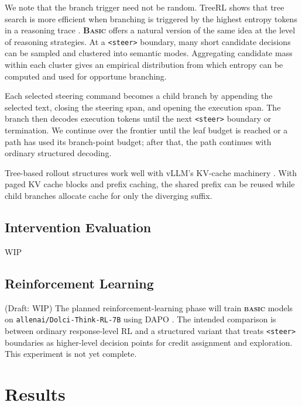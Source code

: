 \documentclass[10pt,twocolumn]{article}
\newcommand{\methodnamestart}{\textbf{\textsf{\textsc{Basic}}}}
\newcommand{\methodname}{\textbf{\textsf{\textsc{basic}}}}
\newcommand{\methodnamestart}{{\sffamily\bfseries B{\fontsize{0.9em}{0.9em}\selectfont ASIC}}}
\newcommand{\methodname}{{\sffamily\bfseries{\fontsize{0.95em}{0.95em}\selectfont BASIC}}}
\begin{document}
We note that the branch trigger need not be random. TreeRL shows that tree
search is more efficient when branching is triggered by the highest entropy tokens in a
reasoning trace \citep{treerl2025}. \methodnamestart{}
offers a natural version of the same idea at the level of reasoning strategies.
At a \texttt{<steer>} boundary, many short candidate decisions can be
sampled and clustered into semantic modes. Aggregating candidate
mass within each cluster gives an empirical distribution from which entropy can be
computed and used for opportune branching.

Each selected steering command becomes a child branch by appending the selected
text, closing the steering span, and opening the execution span. The branch then
decodes execution tokens until the next \texttt{<steer>} boundary or
termination. We continue over the frontier until the leaf budget is reached or a
path has used its branch-point budget; after that, the path continues with
ordinary structured decoding.

Tree-based rollout structures work well with vLLM's KV-cache machinery
\cite{kwon2023pagedattention}. With paged KV cache blocks and prefix caching, the shared
prefix can be reused while child branches allocate cache for only the diverging suffix.

\subsection{Intervention Evaluation}
\label{sec:intervention-evaluation}

WIP

\subsection{Reinforcement Learning}
\label{sec:reinforcement-method}

(Draft: WIP)
\begingroup
\color{red!80!black}
The planned reinforcement-learning phase will train \methodname{} models
on
\texttt{allenai/Dolci-Think-RL-7B} \citep{allenai2026dolcithinkrl7b} using
DAPO \citep{yu2025dapo}. The intended comparison is between ordinary
response-level RL and a structured variant that treats \texttt{<steer>}
boundaries as higher-level decision points for credit assignment and exploration.
This experiment is not yet complete.
\par
\endgroup

\section{Results}
\label{sec:results}
\end{document}
